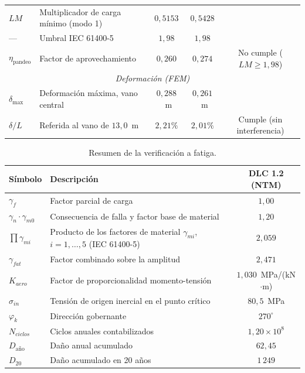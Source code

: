 \begin{table}[H]
\begin{tabular}{l>{\raggedright\arraybackslash}p{5.0cm}ccc}
        \hline
        $LM$ & Multiplicador de carga mínimo (modo 1) & $0{,}5153$ & $0{,}5428$ &  \\
        --- & Umbral IEC 61400-5 & $1{,}98$ & $1{,}98$ &  \\
        $\eta_{\text{pandeo}}$ & Factor de aprovechamiento & $0{,}260$ & $0{,}274$ & No cumple ($LM \geq 1{,}98$) \\
        \hline
        \multicolumn{5}{c}{\textit{Deformación (FEM)}} \\
        \hline
        $\delta_{\max}$ & Deformación máxima, vano central & $0{,}288$~m & $0{,}261$~m &  \\
        $\delta/L$ & Referida al vano de $13{,}0$~m & $2{,}21\%$ & $2{,}01\%$ & Cumple (sin interferencia) \\
        \hline
    \end{tabular}
\end{table}

\begin{table}[H]
    \centering
    \caption{Resumen de la verificación a fatiga.}
    \label{tab:resumen_fatiga}
    \begin{tabular}{llc}
        \hline
        \textbf{Símbolo} & \textbf{Descripción} & \textbf{DLC 1.2 (NTM)} \\
        \hline
        $\gamma_f$ & Factor parcial de carga & $1{,}00$ \\
        $\gamma_n \cdot \gamma_{m0}$ & Consecuencia de falla y factor base de material & $1{,}20$ \\
        $\prod \gamma_{mi}$ & Producto de los factores de material $\gamma_{mi}$, $i = 1, \dots, 5$ (IEC 61400-5) & $2{,}059$ \\
        $\gamma_{fat}$ & Factor combinado sobre la amplitud & $2{,}471$ \\
        $K_{aero}$ & Factor de proporcionalidad momento-tensión & $1{,}030$~MPa/(kN$\cdot$m) \\
        $\sigma_{in}$ & Tensión de origen inercial en el punto crítico & $80{,}5$~MPa \\
        $\varphi_k$ & Dirección gobernante & $270^\circ$ \\
        $N_{ciclos}$ & Ciclos anuales contabilizados & $1{,}20 \times 10^{8}$ \\
        $D_{\text{año}}$ & Daño anual acumulado & $62{,}45$ \\
        $D_{20}$ & Daño acumulado en 20 años & $1\,249$ \\
        \hline
    \end{tabular}
\end{table}

